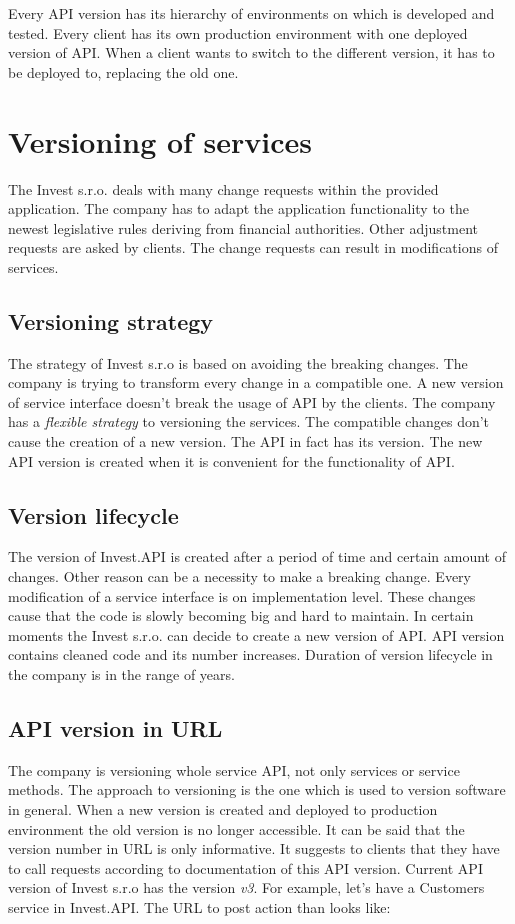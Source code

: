 Every API version has its hierarchy of environments on which is developed and tested. Every client has its own production environment with one deployed version of API. When a client wants to switch to the different version, it has to be deployed to, replacing the old one.


\section{Versioning of services}
The Invest s.r.o. deals with many change requests within the provided application. The company has to adapt the application functionality to the newest legislative rules deriving from financial authorities. Other adjustment requests are asked by clients. The change requests can result in modifications of services.

\subsection{Versioning strategy}
The strategy of Invest s.r.o is based on avoiding the breaking changes. The company is trying to transform every change in a compatible one. A new version of service interface doesn't break the usage of API by the clients. The company has a \emph{flexible strategy} to versioning the services. The compatible changes don't cause the creation of a new version.
The API in fact has its version. The new API version is created when it is convenient for the functionality of API.
 

\subsection{Version lifecycle}
The version of Invest.API is created after a period of time and certain amount of changes. Other reason can be a necessity to make a breaking change. Every modification of a service interface is on implementation level. These changes cause that the code is slowly becoming big and hard to maintain. In certain moments the Invest s.r.o. can decide to create a new version of API. API version contains cleaned code and its number increases. Duration of version lifecycle in the company is in the range of years. 
 
\subsection{API version in URL}
The company is versioning whole service API, not only services or service methods. The approach to versioning is the one which is used to version software in general. When a new version is created and deployed to production environment the old version is no longer accessible. It can be said that the version number in URL is only informative. It suggests to clients that they have to call requests according to \gls{documentation} of this API version. Current API version of Invest s.r.o has the version \emph{v3}. For example, let's have a Customers service in Invest.API. The URL to post action than looks like:

